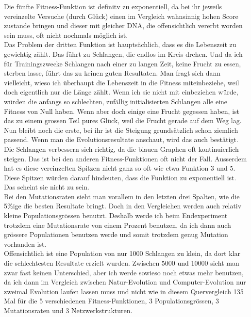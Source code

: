 \documentclass[10pt,a4paper,ngerman,english]{article}
\begin{document}
Die fünfte Fitness-Funktion ist definitv zu exponentiell, da bei ihr jeweils vereinzelte Versuche (durch Glück) einen im Vergleich wahnsinnig hohen Score zustande bringen und dieser mit gleicher DNA, die offensichtlich vererbt worden sein muss, oft nicht nochmals möglich ist.\\

Das Problem der dritten Funktion ist hauptsächlich, dass es die Lebenszeit zu gewichtig zählt. Das führt zu Schlangen, die endlos im Kreis drehen. Und da ich für Trainingszwecke Schlangen nach einer zu langen Zeit, keine Frucht zu essen, sterben lasse, führt das zu keinen guten Resultaten. Man fragt sich dann vielleicht, wieso ich überhaupt die Lebenszeit in die Fitness miteinbeziehe, weil doch eigentlich nur die Länge zählt. Wenn ich sie nicht mit einbeziehen würde, würden die anfangs so schlechten, zufällig initialisierten Schlangen alle eine Fitness von Null haben. Wenn aber doch einige eine Frucht gegessen haben, ist das zu einem grossen Teil pures Glück, weil die Frucht gerade auf dem Weg lag.\\

Nun bleibt noch die erste, bei ihr ist die Steigung grundsätzlich schon ziemlich passend. Wenn man die Evolutionsresultate anschaut, wird das auch bestätigt. Die Schlangen verbessern sich richtig, da die blauen Graphen oft kontinuierlich steigen. Das ist bei den anderen Fitness-Funktionen oft nicht der Fall. Ausserdem hat es diese vereinzelten Spitzen nicht ganz so oft wie etwa Funktion 3 und 5. Diese Spitzen würden darauf hindeuten, dass die Funktion zu exponentiell ist. Das scheint sie nicht zu sein.\\

Bei den Mutationsraten sieht man vorallem in den letzten drei Spalten, wie die 5\%ige die besten Resultate bringt. Doch in den Vergleichen werden auch relativ kleine Populationsgrössen benutzt. Deshalb werde ich beim Endexperiment trotzdem eine Mutationsrate von einem Prozent benutzen, da ich dann auch grössere Populationen benutzen werde und somit trotzdem genug Mutation vorhanden ist.\\

Offensichtlich ist eine Population von nur 1000 Schlangen zu klein, da dort klar die schlechtesten Resultate erzielt wurden. Zwischen 5000 und 10000 sieht man zwar fast keinen Unterschied, aber ich werde sowieso noch etwas mehr benutzen, da ich dann im Vergleich zwischen Natur-Evolution und Computer-Evolution nur zweimal Evolution laufen lassen muss und nicht wie in diesem Quervergleich 135 Mal für die 5 verschiedenen Fitness-Funktionen, 3 Populationsgrössen, 3 Mutationsraten und 3 Netzwerkstrukturen.\\
\end{document}
